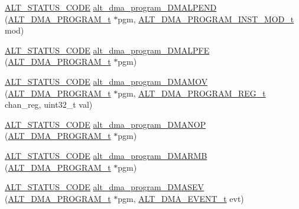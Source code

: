 \begin{DoxyCompactItemize}
\item 
\mbox{\hyperlink{hwlib_8h_abdb0d369f069723ca55d6c94bcaaaa12}{A\+L\+T\+\_\+\+S\+T\+A\+T\+U\+S\+\_\+\+C\+O\+DE}} \mbox{\hyperlink{group__ALT__DMA__PRG_ga36195e7d2102832db066478527e62e92}{alt\+\_\+dma\+\_\+program\+\_\+\+D\+M\+A\+L\+P\+E\+ND}} (\mbox{\hyperlink{group__ALT__DMA__PRG_gadb7028531574894854db4db6d797de97}{A\+L\+T\+\_\+\+D\+M\+A\+\_\+\+P\+R\+O\+G\+R\+A\+M\+\_\+t}} $\ast$pgm, \mbox{\hyperlink{group__ALT__DMA__PRG_gaf8145a0ef11f4188f07bb0c961575d4a}{A\+L\+T\+\_\+\+D\+M\+A\+\_\+\+P\+R\+O\+G\+R\+A\+M\+\_\+\+I\+N\+S\+T\+\_\+\+M\+O\+D\+\_\+t}} mod)
\item 
\mbox{\hyperlink{hwlib_8h_abdb0d369f069723ca55d6c94bcaaaa12}{A\+L\+T\+\_\+\+S\+T\+A\+T\+U\+S\+\_\+\+C\+O\+DE}} \mbox{\hyperlink{group__ALT__DMA__PRG_gaaef613e98af1bd060b7e8aefb9fddcf6}{alt\+\_\+dma\+\_\+program\+\_\+\+D\+M\+A\+L\+P\+FE}} (\mbox{\hyperlink{group__ALT__DMA__PRG_gadb7028531574894854db4db6d797de97}{A\+L\+T\+\_\+\+D\+M\+A\+\_\+\+P\+R\+O\+G\+R\+A\+M\+\_\+t}} $\ast$pgm)
\item 
\mbox{\hyperlink{hwlib_8h_abdb0d369f069723ca55d6c94bcaaaa12}{A\+L\+T\+\_\+\+S\+T\+A\+T\+U\+S\+\_\+\+C\+O\+DE}} \mbox{\hyperlink{group__ALT__DMA__PRG_ga6f996a101038e030bb8f6613b147a781}{alt\+\_\+dma\+\_\+program\+\_\+\+D\+M\+A\+M\+OV}} (\mbox{\hyperlink{group__ALT__DMA__PRG_gadb7028531574894854db4db6d797de97}{A\+L\+T\+\_\+\+D\+M\+A\+\_\+\+P\+R\+O\+G\+R\+A\+M\+\_\+t}} $\ast$pgm, \mbox{\hyperlink{group__ALT__DMA__PRG_ga772371a3d6334e110911154cf94950e8}{A\+L\+T\+\_\+\+D\+M\+A\+\_\+\+P\+R\+O\+G\+R\+A\+M\+\_\+\+R\+E\+G\+\_\+t}} chan\+\_\+reg, uint32\+\_\+t val)
\item 
\mbox{\hyperlink{hwlib_8h_abdb0d369f069723ca55d6c94bcaaaa12}{A\+L\+T\+\_\+\+S\+T\+A\+T\+U\+S\+\_\+\+C\+O\+DE}} \mbox{\hyperlink{group__ALT__DMA__PRG_ga18a7bc745f58b645f2acf26705247e3b}{alt\+\_\+dma\+\_\+program\+\_\+\+D\+M\+A\+N\+OP}} (\mbox{\hyperlink{group__ALT__DMA__PRG_gadb7028531574894854db4db6d797de97}{A\+L\+T\+\_\+\+D\+M\+A\+\_\+\+P\+R\+O\+G\+R\+A\+M\+\_\+t}} $\ast$pgm)
\item 
\mbox{\hyperlink{hwlib_8h_abdb0d369f069723ca55d6c94bcaaaa12}{A\+L\+T\+\_\+\+S\+T\+A\+T\+U\+S\+\_\+\+C\+O\+DE}} \mbox{\hyperlink{group__ALT__DMA__PRG_gac5ce1757251771e4126ccc4c6ac88740}{alt\+\_\+dma\+\_\+program\+\_\+\+D\+M\+A\+R\+MB}} (\mbox{\hyperlink{group__ALT__DMA__PRG_gadb7028531574894854db4db6d797de97}{A\+L\+T\+\_\+\+D\+M\+A\+\_\+\+P\+R\+O\+G\+R\+A\+M\+\_\+t}} $\ast$pgm)
\item 
\mbox{\hyperlink{hwlib_8h_abdb0d369f069723ca55d6c94bcaaaa12}{A\+L\+T\+\_\+\+S\+T\+A\+T\+U\+S\+\_\+\+C\+O\+DE}} \mbox{\hyperlink{group__ALT__DMA__PRG_ga63f75901eccae410d2110e1c3927e94e}{alt\+\_\+dma\+\_\+program\+\_\+\+D\+M\+A\+S\+EV}} (\mbox{\hyperlink{group__ALT__DMA__PRG_gadb7028531574894854db4db6d797de97}{A\+L\+T\+\_\+\+D\+M\+A\+\_\+\+P\+R\+O\+G\+R\+A\+M\+\_\+t}} $\ast$pgm, \mbox{\hyperlink{group__ALT__DMA__COMMON_gad02f1735ad41b201414e8d032e0f9426}{A\+L\+T\+\_\+\+D\+M\+A\+\_\+\+E\+V\+E\+N\+T\+\_\+t}} evt)

\end{DoxyCompactItemize}
